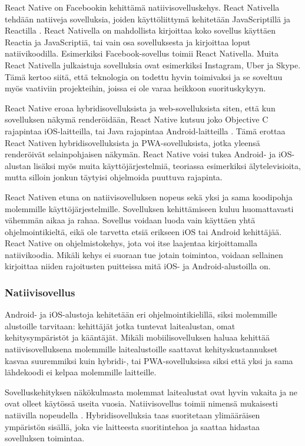 \documentclass{tktltiki}
\begin{document}
React Native on Facebookin kehittämä natiivisovelluskehys. React Nativella tehdään natiiveja sovelluksia, joiden käyttöliittymä kehitetään JavaScriptillä ja Reactilla \cite{Facebook}. React Nativella on mahdollista kirjoittaa koko sovellus käyttäen Reactia ja JavaScriptiä, tai vain osa sovelluksesta ja kirjoittaa loput natiivikoodilla. Esimerkiksi Facebook-sovellus toimii React Nativella. Muita React Nativella julkaistuja sovelluksia ovat esimerkiksi Instagram, Uber ja Skype. Tämä kertoo siitä, että teknologia on todettu hyvin toimivaksi ja se soveltuu myös vaativiin projekteihin, joissa ei ole varaa heikkoon suorituskykyyn.

React Native eroaa hybridisovelluksista ja web-sovelluksista siten, että kun sovelluksen näkymä renderöidään, React Native kutsuu joko Objective C rajapintaa iOS-laitteilla, tai Java rajapintaa Android-laitteilla \cite{Aggarwal}. Tämä erottaa React Nativen hybridisovelluksista ja PWA-sovelluksista, jotka yleensä renderöivät selainpohjaisen näkymän. React Native voisi tukea Android- ja iOS-alustan lisäksi myös muita käyttöjärjestelmiä, teoriassa esimerkiksi älytelevisioita, mutta silloin jonkun täytyisi ohjelmoida puuttuva rajapinta.  

React Nativen etuna on natiivisovelluksen nopeus sekä yksi ja sama koodipohja molemmille käyttöjärjestelmille. Sovelluksen kehittämiseen kuluu huomattavasti vähemmän aikaa ja rahaa. Sovellus voidaan luoda vain käyttäen yhtä ohjelmointikieltä, eikä ole tarvetta etsiä erikseen iOS tai Android kehittäjää. React Native on ohjelmistokehys, jota voi itse laajentaa kirjoittamalla natiivikoodia. Mikäli kehys ei suoraan tue jotain toimintoa, voidaan sellainen kirjoittaa niiden rajoitusten puitteissa mitä iOS- ja Android-alustoilla on.

\subsubsection{Natiivisovellus}

Android- ja iOS-alustoja kehitetään eri ohjelmointikielillä, siksi molemmille alustoille tarvitaan: kehittäjät jotka tuntevat laitealustan, omat kehitysympäristöt ja kääntäjät. Mikäli mobiilisovelluksen haluaa kehittää natiivisovelluksena molemmille laitealustoille saattavat kehityskustannukset kasvaa suuremmiksi kuin hybridi-, tai PWA-sovelluksissa siksi että yksi ja sama lähdekoodi ei kelpaa molemmille laitteille. 

Sovelluskehityksen näkökulmasta molemmat laitealustat ovat hyvin vakaita ja ne ovat olleet käytössä useita vuosia. Natiivisovellus toimii nimensä mukaisesti natiivilla nopeudella \cite{6588524}. Hybridisovelluksia taas suoritetaan ylimääräisen ympäristön sisällä, joka vie laitteesta suoritintehoa ja saattaa hidastaa sovelluksen toimintaa. 
\end{document}

